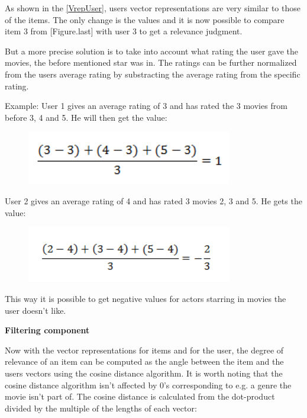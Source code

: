 As shown in the \ref{VrepUser}, users vector representations are very similar to those of the items. The only change is the values and it is now possible to compare item 3 from [Figure.last] with user 3 to get a relevance judgment.

But a more precise solution is to take into account what rating the user gave the movies, the before mentioned star was in. The ratings can be further normalized from the users average rating by substracting the average rating from the specific rating.

Example:
User 1 gives an average rating of 3 and has rated the 3 movies from before 3, 4 and 5. He will then get the value:

\begin{figure}[H]
\centering
\includegraphics[width=0.8\textwidth]{Images/User feature 1.png}
\caption{}
\label{Feature1}
\end{figure}

User 2 gives an average rating of 4 and has rated 3 movies 2, 3 and 5. He gets the value:

\begin{figure}[H]
\centering
\includegraphics[width=0.8\textwidth]{Images/User feature 2.png}
\caption{}
\label{Feature2}
\end{figure}

This way it is possible to get negative values for actors starring in movies the user doesn't like.

 
\textbf{Filtering component}

Now with the vector representations for items and for the user, the degree of relevance of an item can be computed as the angle between the item and the users vectors using the cosine distance algorithm. It is worth noting that the cosine distance algorithm isn't affected by 0's corresponding to e.g. a genre the movie isn't part of. The cosine distance is calculated from the dot-product divided by the multiple of the lengths of each vector:

